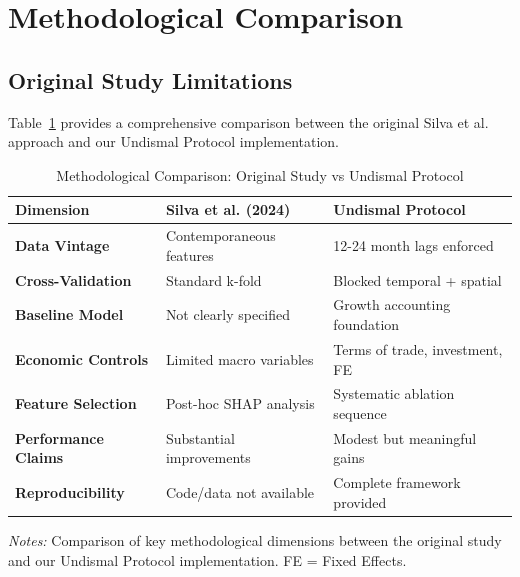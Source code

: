 \documentclass[11pt,a4paper]{article}
\begin{document}
\section{Methodological Comparison}

\subsection{Original Study Limitations}

Table~\ref{tab:methodology_comparison} provides a comprehensive comparison between the original Silva et al. approach and our Undismal Protocol implementation.

\begin{table}[H]
\centering
\caption{Methodological Comparison: Original Study vs Undismal Protocol}
\label{tab:methodology_comparison}
\begin{tabular}{p{4cm}p{5cm}p{5cm}}
\toprule
\textbf{Dimension} & \textbf{Silva et al. (2024)} & \textbf{Undismal Protocol} \\
\midrule
\textbf{Data Vintage} & Contemporaneous features & 12-24 month lags enforced \\
\textbf{Cross-Validation} & Standard k-fold & Blocked temporal + spatial \\
\textbf{Baseline Model} & Not clearly specified & Growth accounting foundation \\
\textbf{Economic Controls} & Limited macro variables & Terms of trade, investment, FE \\
\textbf{Feature Selection} & Post-hoc SHAP analysis & Systematic ablation sequence \\
\textbf{Performance Claims} & Substantial improvements & Modest but meaningful gains \\
\textbf{Reproducibility} & Code/data not available & Complete framework provided \\
\bottomrule
\end{tabular}
\begin{minipage}{\textwidth}
\footnotesize
\textit{Notes:} Comparison of key methodological dimensions between the original study and our Undismal Protocol implementation. FE = Fixed Effects.
\end{minipage}
\end{table}
\end{document}
